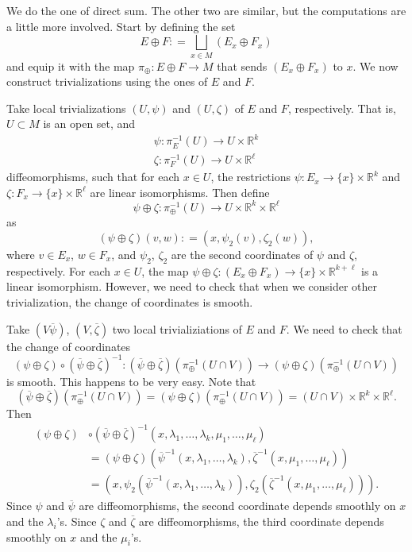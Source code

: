\documentclass{ximera}
\begin{document}
\begin{solution}
We do the one of direct sum. The other two are similar, but the computations are a little more involved. Start by defining the set 
\[    E \oplus F : = \bigsqcup _{x \in M} (E _x \oplus F_x)        \]
and equip it with the map $\pi _{\oplus} : E \oplus F \to M$ that sends $(E _x \oplus F_x) $ to $x$. We now construct trivializations using the ones of $E$ and $F$. 

Take local trivializations $(U , \psi )$ and $(U , \zeta )$ of $E $ and $F$, respectively. That is, $U \subset M$ is an open set, and 
\begin{gather*}
        \psi : \pi_E^{-1} (U) \to U \times \mathbb{R}^k  \\
        \zeta : \pi_F^{-1} (U) \to U \times \mathbb{R}^{\ell} 
\end{gather*} 
diffeomorphisms, such that for each $x \in U$, the restrictions $\psi : E_x \to \{ x \} \times \mathbb{R}^k$ and $\zeta : F_ x \to \{ x \} \times \mathbb{R}^{\ell}$ are linear isomorphisms.  Then define 
\[   \psi \oplus \zeta : \pi _{\oplus}^{-1} (U) \to U \times \mathbb{R} ^k \times \mathbb{R}^{\ell}    \]
as
 \[  ( \psi \oplus \zeta )( v, w )  : = (x , \psi _2 (v), \zeta _2 (w) ) ,                     \]
where $v \in E_x$, $w \in F_x$, and $\psi _2$, $\zeta _2$ are the second coordinates of $\psi$ and $\zeta$, respectively. For each $x \in U$, the map $\psi \oplus \zeta : (E _x \oplus F_x) \to \{ x \} \times \mathbb{R}^{k + \ell }$ is a linear isomorphism. However, we need to check that when we consider other trivialization, the change of coordinates is smooth. 

Take $(V \overline{\psi}) $, $(V, \overline{\zeta})$ two local trivializiations of $E$ and $F$. We need to check that the change of coordinates 
\[  (\psi \oplus \zeta ) \circ (\overline{\psi} \oplus \overline{\zeta})^{-1} : (\overline{\psi} \oplus \overline{\zeta}) (\pi_{\oplus} ^{-1} (U \cap V) ) \to ( \psi \oplus \zeta ) (\pi_{\oplus} ^{-1} (U \cap V) )                       \]
is smooth. This happens to be very easy.  Note that 
\[  (\overline{\psi} \oplus \overline{\zeta}) (\pi_{\oplus} ^{-1} (U \cap V) ) =  ( \psi \oplus \zeta ) (\pi_{\oplus} ^{-1} (U \cap V) )   =   (U \cap V)  \times \mathbb{R}^k \times \mathbb{R}^{\ell}   .  \]
Then
\begin{align*}
    (\psi \oplus \zeta ) & \circ (\overline{\psi} \oplus \overline{\zeta})^{-1}  (  x, \lambda_1, \ldots , \lambda_k , \mu _1, \ldots , \mu _{\ell} )   \\
    & = (\psi \oplus \zeta ) ( \overline{\psi} ^{-1} (x, \lambda_1, \ldots , \lambda _k), \overline{\zeta}^{-1}(x, \mu_1, \ldots , \mu_{\ell}))    \\
    & = (  x , \psi _2 ( \overline{\psi}^{-1} (x, \lambda_1, \ldots , \lambda _k) ) , \zeta _2 (\overline{ \zeta }^{-1} ( x, \mu _1, \ldots , \mu _ {\ell}   ) ) )    .
\end{align*}
Since $\psi $ and $\overline{\psi}$ are diffeomorphisms, the second coordinate depends smoothly on $x$ and the $\lambda_i$'s. Since $\zeta $ and $\overline{\zeta}$ are diffeomorphisms, the third coordinate depends smoothly on $x$ and the $\mu _i $'s.     
\end{solution}
\end{document}
